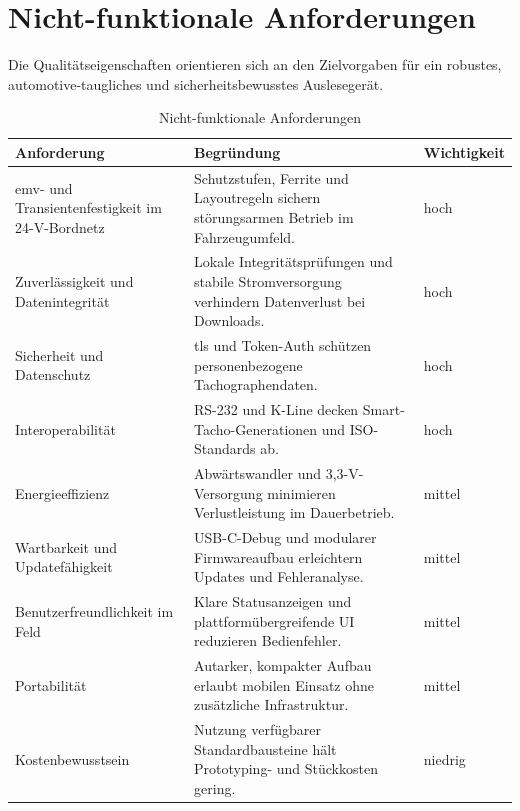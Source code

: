 \section{Nicht-funktionale Anforderungen}

Die Qualitätseigenschaften orientieren sich an den Zielvorgaben für ein robustes, automotive-taugliches und sicherheitsbewusstes Auslesegerät.

\begin{table}[H]
  \centering
  \begin{tabularx}{\textwidth}{|>{\raggedright\arraybackslash}p{}|>{\raggedright\arraybackslash}X|>{\raggedright\arraybackslash}p{}|}
    \hline
    \textbf{Anforderung} & \textbf{Begründung} & \textbf{Wichtigkeit} \\
    \hline
    \gls{emv}- und Transientenfestigkeit im 24-V-Bordnetz & Schutzstufen, Ferrite und Layoutregeln sichern störungsarmen Betrieb im Fahrzeugumfeld. & hoch \\
    \hline
    Zuverlässigkeit und Datenintegrität & Lokale Integritätsprüfungen und stabile Stromversorgung verhindern Datenverlust bei Downloads. & hoch \\
    \hline
    Sicherheit und Datenschutz & \gls{tls} und Token-Auth schützen personenbezogene Tachographendaten. & hoch \\
    \hline
    Interoperabilität & RS-232 und K-Line decken Smart-Tacho-Generationen und ISO-Standards ab. & hoch \\
    \hline
    Energieeffizienz & Abwärtswandler und 3,3-V-Versorgung minimieren Verlustleistung im Dauerbetrieb. & mittel \\
    \hline
    Wartbarkeit und Updatefähigkeit & USB-C-Debug und modularer Firmwareaufbau erleichtern Updates und Fehleranalyse. & mittel \\
    \hline
    Benutzerfreundlichkeit im Feld & Klare Statusanzeigen und plattformübergreifende UI reduzieren Bedienfehler. & mittel \\
    \hline
    Portabilität & Autarker, kompakter Aufbau erlaubt mobilen Einsatz ohne zusätzliche Infrastruktur. & mittel \\
    \hline
    Kostenbewusstsein & Nutzung verfügbarer Standardbausteine hält Prototyping- und Stückkosten gering. & niedrig \\
    \hline
  \end{tabularx}
  \vspace{0.3\baselineskip}
  \caption{Nicht-funktionale Anforderungen}
  \label{tab:nichtfunktionale-anforderungen}
\end{table}


